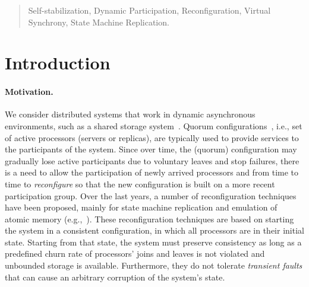 \documentclass[11pt]{article}
\begin{document}
\begin{titlepage}
\begin{abstract}
 Self-stabilization, Dynamic Participation, Reconfiguration, Virtual Synchrony, State Machine Replication.\vspace{2em}









\end{abstract}




\end{titlepage}

\renewcommand{\thefootnote}{\arabic{footnote}}







\section{Introduction} 
\paragraph{Motivation.} 
We consider distributed systems that work in dynamic asynchronous environments, such as a shared storage system~\cite{DBLP:journals/cacm/MusialNS14}. Quorum configurations~\cite{DBLP:journals/dc/PelegW97,DBLP:series/synthesis/2012Vukolic}, 
i.e., set of active processors (servers or replicas), are typically used to provide services to the participants of the system. Since over time, the (quorum) configuration may gradually lose active participants due to voluntary leaves and stop failures, there is a need to allow the participation of newly arrived processors and from time to time to \emph{reconfigure} so that the new configuration is built on a more recent participation group. Over the last years, 
a number of reconfiguration techniques have been proposed, mainly for state machine replication and emulation of atomic memory 
(e.g.,~\cite{DynaStore,birmanMR2010,DBLP:journals/corr/BortnikovCPRSS15,RAMBO,DBLP:journals/eatcs/AguileraKMMS10,spiegelmandynamic,DBLP:journals/sigact/LamportMZ10,DBLP:conf/wdag/AttiyaCEKW15,DBLP:conf/wdag/GafniM15,DBLP:conf/wdag/JehlVM15,Baldoni09,DBLP:journals/jpdc/ChocklerGGMS09}). These reconfiguration techniques are based on starting the system in a consistent configuration, in which all processors are in their initial state. Starting from that state, the system must preserve consistency as long as a predefined churn rate of processors' joins and leaves is not violated and unbounded storage is available. Furthermore, they do not tolerate {\em transient faults} that can cause an arbitrary corruption of the system's state.
\end{document}
